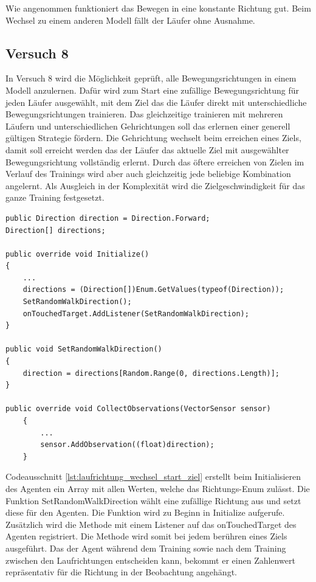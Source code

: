 Wie angenommen funktioniert das Bewegen in eine konstante Richtung gut. Beim Wechsel zu einem anderen Modell fällt der Läufer ohne Ausnahme.

\subsection{Versuch 8}
In Versuch 8 wird die Möglichkeit geprüft, alle Bewegungsrichtungen in einem Modell anzulernen. Dafür wird zum Start eine zufällige Bewegungsrichtung für jeden Läufer ausgewählt, mit dem Ziel das die Läufer direkt mit unterschiedliche Bewegungsrichtungen trainieren. Das gleichzeitige trainieren mit mehreren Läufern und unterschiedlichen Gehrichtungen soll das erlernen einer generell gültigen Strategie fördern. Die Gehrichtung wechselt beim erreichen eines Ziels, damit soll erreicht werden das der Läufer das aktuelle Ziel mit ausgewählter Bewegungsrichtung vollständig erlernt. Durch das öftere erreichen von Zielen im Verlauf des Trainings wird aber auch gleichzeitig jede beliebige Kombination angelernt. Als Ausgleich in der Komplexität wird die Zielgeschwindigkeit für das ganze Training festgesetzt.

\begin{lstlisting}[caption={Laufrichtung zufällig zum Start und beim erreichen von Ziel},captionpos=b,label={lst:laufrichtung_wechsel_start_ziel}]
public Direction direction = Direction.Forward;
Direction[] directions;

public override void Initialize()
{
    ...
    directions = (Direction[])Enum.GetValues(typeof(Direction));
    SetRandomWalkDirection();
    onTouchedTarget.AddListener(SetRandomWalkDirection);
}

public void SetRandomWalkDirection()
{
    direction = directions[Random.Range(0, directions.Length)];
}

public override void CollectObservations(VectorSensor sensor)
    {
        ...
        sensor.AddObservation((float)direction);
    }
\end{lstlisting}

Codeausschnitt \ref{lst:laufrichtung_wechsel_start_ziel} erstellt beim Initialisieren des Agenten ein Array mit allen Werten, welche das Richtungs-Enum zulässt. Die Funktion SetRandomWalkDirection wählt eine zufällige Richtung aus und setzt diese für den Agenten. Die Funktion wird zu Beginn in Initialize aufgerufe. Zusätzlich wird die Methode mit einem Listener auf das onTouchedTarget des Agenten registriert. Die Methode wird somit bei jedem berühren eines Ziels ausgeführt. Das der Agent während dem Training sowie nach dem Training zwischen den Laufrichtungen entscheiden kann, bekommt er einen Zahlenwert repräsentativ für die Richtung in der Beobachtung angehängt.

